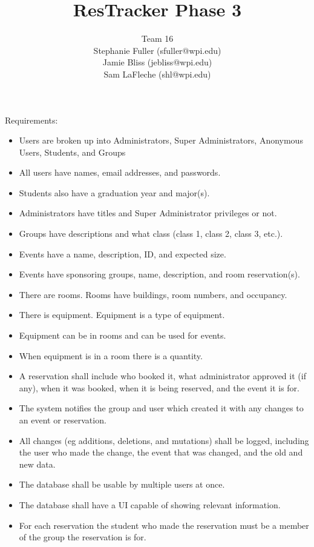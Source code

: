 \documentclass{article}
\title{ResTracker Phase 3}
\author{Team 16\\Stephanie Fuller (sfuller@wpi.edu)\\Jamie Bliss (jebliss@wpi.edu)\\Sam
LaFleche (shl@wpi.edu)}
\begin{document}
\maketitle

\section{}
Requirements:

\begin{itemize}
\item Users are broken up into Administrators, Super Administrators, Anonymous Users, Students, and Groups
\item All users have names, email addresses, and passwords.
\item Students also have a graduation year and major(s).
\item Administrators have titles and Super Administrator privileges or not. 
\item Groups have descriptions and what class (class 1, class 2, class 3, etc.).
\item Events have a name, description, ID, and expected size.
\item Events have sponsoring groups, name, description, and room reservation(s).
\item There are rooms. Rooms have buildings, room numbers, and occupancy.
\item There is equipment. Equipment is a type of equipment.
\item Equipment can be in rooms and can be used for events.
\item When equipment is in a room there is a quantity.
\item A reservation shall include who booked it, what administrator
approved it (if any), when it was booked, when it is being reserved,
and the event it is for.
\item The system notifies the group and user which created it with any
changes to an event or reservation.
\item All changes (eg additions, deletions, and mutations) shall be
logged, including the user who made the change, the event that was
changed, and the old and new data.
\item The database shall be usable by multiple users at once.
\item The database shall have a UI capable of showing relevant information.
\item For each reservation the student who made the reservation must
be a member of the group the reservation is for.

\end{itemize}
\end{document}

